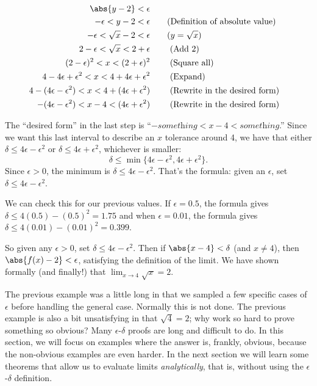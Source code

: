 {\begin{align*}
\abs{y - 2} < \epsilon \\
-\epsilon < y - 2 < \epsilon & \qquad \textrm{(Definition of absolute value)}\\
-\epsilon < \sqrt{x} - 2 < \epsilon  &\qquad\text{($y=\sqrt{x}$)}\\
2 - \epsilon < \sqrt{x} < 2+ \epsilon &\qquad \textrm{ (Add 2)}\\
(2 - \epsilon)^2 < x < (2+ \epsilon) ^2 &\qquad \textrm{ (Square all)}\\
4 - 4\epsilon + \epsilon^2 < x < 4 + 4\epsilon + \epsilon^2 &\qquad \textrm{ (Expand)}\\
4 - (4\epsilon - \epsilon^2) < x < 4 + (4\epsilon + \epsilon^2) &\qquad \textrm{ (Rewrite in the desired form)} \\
- (4\epsilon - \epsilon^2) < x-4 < (4\epsilon + \epsilon^2) &\qquad \textrm{ (Rewrite in the desired form)}
\end{align*}

The ``desired form'' in the last step is ``$-\textit{something} < x-4 < \textit{something}$.''
Since we want this last interval to describe an $x$ tolerance around 4, we have that either $\delta \leq 4\epsilon - \epsilon^2$ or $\delta \leq 4\epsilon + \epsilon^2$, whichever is smaller: \[\delta \leq \min\{4\epsilon - \epsilon^2, 4\epsilon + \epsilon^2\}\text{.}\]  Since $\epsilon > 0$, the minimum is $\delta \leq 4\epsilon - \epsilon^2$.  That's the formula: given an $\epsilon$, set $\delta \leq 4\epsilon-\epsilon^2$. 

We can check this for our previous values.  If $\epsilon=0.5$, the formula gives
$\delta \leq 4(0.5) - (0.5)^2 = 1.75$ and when $\epsilon=0.01$, the formula gives $\delta \leq 4(0.01) - (0.01)^2 = 0.399$.

So given any $\epsilon >0$, set $\delta \leq 4\epsilon - \epsilon^2$. Then if $\abs{x-4}<\delta$ (and $x\neq 4$), then $\abs{f(x) - 2} < \epsilon$,  satisfying the definition of the limit.  We have shown formally (and finally!) that $\displaystyle \lim_{x\rightarrow 4} \sqrt{x} = 2 $.}

The previous example was a little long in that we sampled a few specific cases of $\epsilon$ before handling the general case. Normally this is not done.  The previous example is also a bit unsatisfying in that $\sqrt{4}=2$; why work so hard to prove something so obvious? Many $\epsilon$-$\delta$ proofs are long and difficult to do. In this section, we will focus on examples where the answer is, frankly, obvious, because the non-obvious examples are even harder. In the next section we will learn some theorems that allow us to evaluate limits \textit{analytically}, that is, without using the $\epsilon$-$\delta$ definition.

